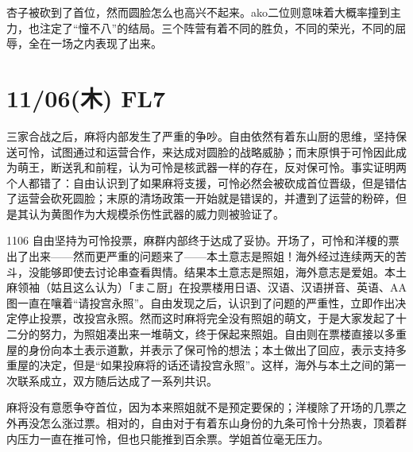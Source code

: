 杏子被砍到了首位，然而圆脸怎么也高兴不起来。ako二位则意味着大概率撞到主力，也注定了“憧不八”的结局。三个阵营有着不同的胜负，不同的荣光，不同的屈辱，全在一场之内表现了出来。

\section{11/06(木) FL7}


三家合战之后，麻将内部发生了严重的争吵。自由依然有着东山厨的思维，坚持保送可怜，试图通过和运营合作，来达成对圆脸的战略威胁；而末原惧于可怜因此成为萌王，断送乳和前程，认为可怜是核武器一样的存在，反对保可怜。事实证明两个人都错了：自由认识到了如果麻将支援，可怜必然会被砍成首位晋级，但是错估了运营会砍死圆脸；末原的清场政策一开始就是错误的，并遭到了运营的粉碎，但是其认为黄图作为大规模杀伤性武器的威力则被验证了。

1106 自由坚持为可怜投票，麻群内部终于达成了妥协。开场了，可怜和洋榎的票出了出来——然而更严重的问题来了——本土意志是照姐！海外经过连续两天的苦斗，没能够即使去讨论串查看舆情。结果本土意志是照姐，海外意志是爱姐。本土麻领袖（姑且这么认为）「まこ厨」在投票楼用日语、汉语、汉语拼音、英语、AA图一直在嚷着“请投宫永照”。自由发现之后，认识到了问题的严重性，立即作出决定停止投票，改投宫永照。然而这时麻将完全没有照姐的萌文，于是大家发起了十二分的努力，为照姐凑出来一堆萌文，终于保起来照姐。自由则在票楼直接以多重屋的身份向本土表示道歉，并表示了保可怜的想法；本土做出了回应，表示支持多重屋的决定，但是“如果投麻将的话还请投宫永照”。这样，海外与本土之间的第一次联系成立，双方随后达成了一系列共识。

麻将没有意愿争夺首位，因为本来照姐就不是预定要保的；洋榎除了开场的几票之外再没怎么涨过票。相对的，自由对于有着东山身份的九条可怜十分热衷，顶着群内压力一直在推可怜，但也只能推到百余票。学姐首位毫无压力。


